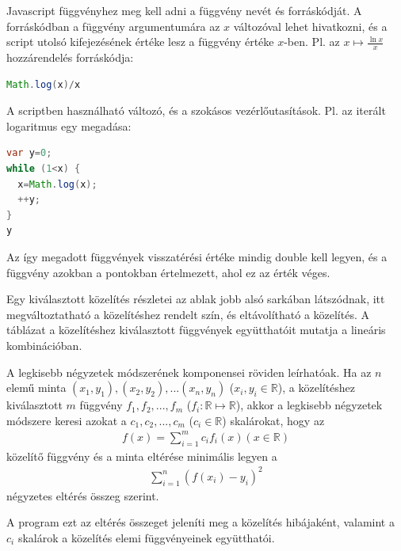 Javascript függvényhez meg kell adni a függvény nevét és forráskódját.
A forráskódban a függvény argumentumára az $x$ változóval lehet hivatkozni,
és a script utolsó kifejezésének értéke lesz a függvény
értéke $x$-ben. Pl. az $x \mapsto \frac{\ln{x}}{x}$ hozzárendelés
forráskódja:

\begin{lstlisting}[basicstyle=\small, language=Java]
Math.log(x)/x
\end{lstlisting}

A scriptben használható változó, és a szokásos vezérlőutasítások.
Pl. az iterált logaritmus egy megadása:
\begin{lstlisting}[basicstyle=\small, language=Java,morekeywords=var]
var y=0;
while (1<x) {
  x=Math.log(x);
  ++y;
}
y
\end{lstlisting}

Az így megadott függvények visszatérési értéke mindig double kell legyen,
és a függvény azokban a pontokban értelmezett, ahol ez az érték véges.

Egy kiválasztott közelítés részletei az ablak jobb alsó sarkában látszódnak,
itt megváltoztatható a közelítéshez rendelt szín, és eltávolítható a közelítés.
A táblázat a közelítéshez kiválasztott függvények együtthatóit mutatja
a lineáris kombinációban.

A legkisebb négyzetek módszerének komponensei
röviden leírhatóak.
Ha az $n$ elemű minta
$(x_1, y_1), (x_2, y_2), ... (x_n, y_n)$
($x_i, y_i \in \mathbb{R}$),
a közelítéshez kiválasztott $m$ függvény
$f_1, f_2, ..., f_m$ ($f_i:\mathbb{R} \mapsto \mathbb{R}$),
akkor a legkisebb négyzetek módszere
keresi azokat a $c_1, c_2, ..., c_m$ ($c_i \in \mathbb{R}$)
skalárokat, hogy az
\begin{align*}
f(x)=\sum_{i=1}^m c_i f_i(x) (x \in \mathbb{R})
\end{align*}
közelítő függvény és a minta eltérése minimális
legyen a
\begin{align*}
\sum_{i=1}^{n} (f(x_i)-y_i)^2
\end{align*}
négyzetes eltérés összeg szerint.

A program ezt az eltérés összeget jeleníti meg a közelítés
hibájaként, valamint a $c_i$ skalárok
a közelítés elemi függvényeinek együtthatói.

